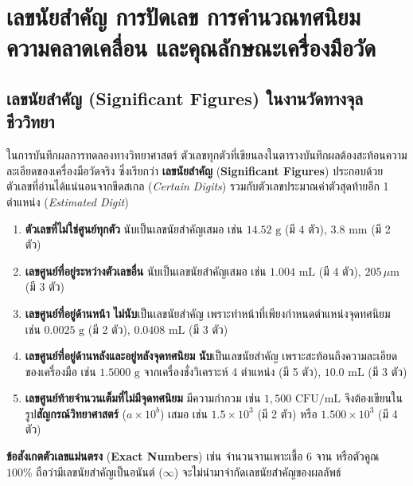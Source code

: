 \section{เลขนัยสำคัญ การปัดเลข การคำนวณทศนิยม ความคลาดเคลื่อน และคุณลักษณะเครื่องมือวัด}

\subsection{เลขนัยสำคัญ (Significant Figures) ในงานวัดทางจุลชีววิทยา}

ในการบันทึกผลการทดลองทางวิทยาศาสตร์ ตัวเลขทุกตัวที่เขียนลงในตารางบันทึกผลต้องสะท้อนความละเอียดของเครื่องมือวัดจริง ซึ่งเรียกว่า \textbf{เลขนัยสำคัญ} (\textbf{Significant Figures}) ประกอบด้วยตัวเลขที่อ่านได้แน่นอนจากขีดสเกล (\textit{Certain Digits}) รวมกับตัวเลขประมาณค่าตัวสุดท้ายอีก 1 ตำแหน่ง (\textit{Estimated Digit})

\begin{conceptbox}
\begin{enumerate}
    \item \textbf{ตัวเลขที่ไม่ใช่ศูนย์ทุกตัว} นับเป็นเลขนัยสำคัญเสมอ เช่น $14.52\text{ g}$ (มี 4 ตัว), $3.8\text{ mm}$ (มี 2 ตัว)
    \item \textbf{เลขศูนย์ที่อยู่ระหว่างตัวเลขอื่น} นับเป็นเลขนัยสำคัญเสมอ เช่น $1.004\text{ mL}$ (มี 4 ตัว), $205\,\mu\text{m}$ (มี 3 ตัว)
    \item \textbf{เลขศูนย์ที่อยู่ด้านหน้า} \textbf{ไม่นับ}เป็นเลขนัยสำคัญ เพราะทำหน้าที่เพียงกำหนดตำแหน่งจุดทศนิยม เช่น $0.0025\text{ g}$ (มี 2 ตัว), $0.0408\text{ mL}$ (มี 3 ตัว)
    \item \textbf{เลขศูนย์ที่อยู่ด้านหลังและอยู่หลังจุดทศนิยม} \textbf{นับ}เป็นเลขนัยสำคัญ เพราะสะท้อนถึงความละเอียดของเครื่องมือ เช่น $1.5000\text{ g}$ จากเครื่องชั่งวิเคราะห์ 4 ตำแหน่ง (มี 5 ตัว), $10.0\text{ mL}$ (มี 3 ตัว)
    \item \textbf{เลขศูนย์ท้ายจำนวนเต็มที่ไม่มีจุดทศนิยม} มีความกำกวม เช่น $1{,}500\text{ CFU/mL}$ จึงต้องเขียนในรูป\textbf{สัญกรณ์วิทยาศาสตร์} ($a \times 10^b$) เสมอ เช่น $1.5 \times 10^3$ (มี 2 ตัว) หรือ $1.500 \times 10^3$ (มี 4 ตัว)
\end{enumerate}
\vspace{2pt}
\noindent\textbf{ข้อสังเกต}\quad \textbf{ตัวเลขแม่นตรง} (\textbf{Exact Numbers}) เช่น จำนวนจานเพาะเชื้อ 6 จาน หรือตัวคูณ $100\%$ ถือว่ามีเลขนัยสำคัญเป็นอนันต์ ($\infty$) จะไม่นำมาจำกัดเลขนัยสำคัญของผลลัพธ์
\end{conceptbox}


